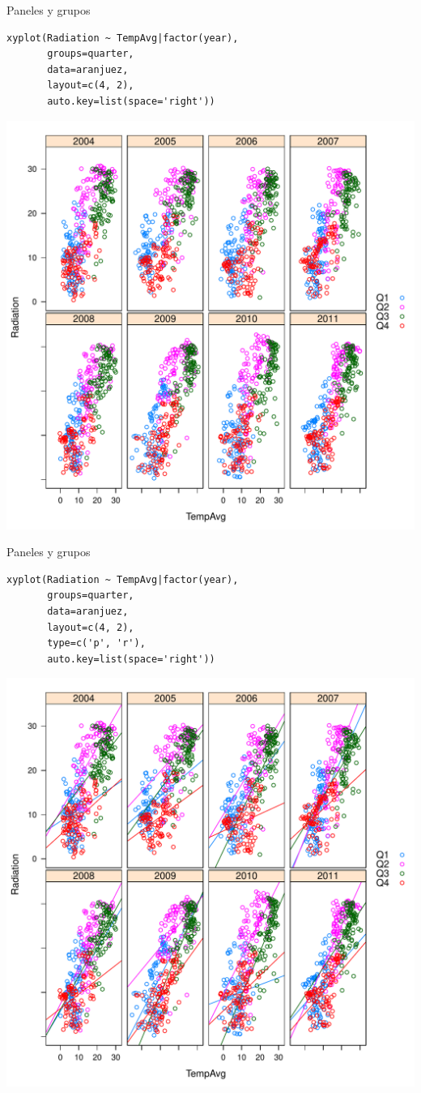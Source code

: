 \documentclass[xcolor={usenames,svgnames,dvipsnames}]{beamer}
\begin{document}
\begin{frame}[fragile,label=sec-2-1-8]{Paneles y grupos}
 \lstset{language=R,numbers=none}
\begin{lstlisting}
xyplot(Radiation ~ TempAvg|factor(year),
       groups=quarter,
       data=aranjuez,
       layout=c(4, 2),
       auto.key=list(space='right'))
\end{lstlisting}

\includegraphics[width=.9\linewidth]{figs/xyplotQuarterYear.pdf}
\end{frame}
\begin{frame}[fragile,label=sec-2-1-9]{Paneles y grupos}
 \lstset{language=R,numbers=none}
\begin{lstlisting}
xyplot(Radiation ~ TempAvg|factor(year),
       groups=quarter,
       data=aranjuez,
       layout=c(4, 2),
       type=c('p', 'r'),
       auto.key=list(space='right'))
\end{lstlisting}

\includegraphics[width=.9\linewidth]{figs/xyplotQuarterYearSmooth.pdf}
\end{frame}
\end{document}

